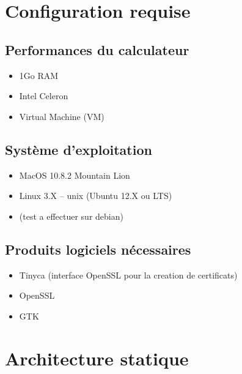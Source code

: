 \documentclass[a4paper,11pt,french]{article}
\begin{document}
\section{Configuration requise}
\vspace{0.8cm}
\subsection{Performances du calculateur}
\begin{itemize}
\item 1Go RAM 
\item Intel Celeron
\item Virtual Machine (VM)
\end{itemize}
\vspace{0.3cm}
\subsection{Système d’exploitation}
\begin{itemize}
\item MacOS 10.8.2 Mountain Lion
\item Linux 3.X – unix (Ubuntu 12.X ou LTS)
\item(test a effectuer  sur debian)
\end{itemize}
\vspace{0.3cm}
\subsection{Produits logiciels nécessaires}
\begin{itemize}
\item Tinyca (interface OpenSSL pour la creation de certificats)
\item OpenSSL
\item GTK
\end{itemize}

\vspace{0.8cm}
\section{Architecture statique}
\vspace{0.3cm}
\end{document}
